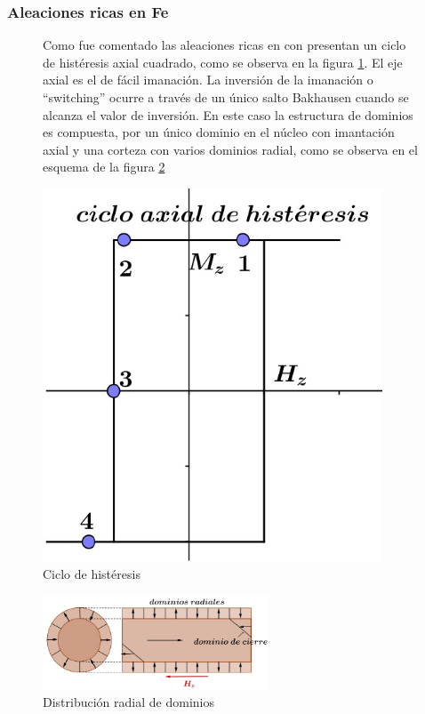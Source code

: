 \subsubsection{Aleaciones ricas en Fe}

\begin{figure}[H]
  \begin{minipage}[b]{0.47\textwidth}
Como fue comentado las aleaciones ricas en con presentan un ciclo de histéresis axial cuadrado, como se observa en la figura \ref{fig:310}. El eje axial es el de fácil imanación. La inversión de la imanación o “switching” ocurre a través de un único salto Bakhausen cuando se alcanza el valor de inversión. En este caso la estructura de dominios es compuesta, por un único dominio en el núcleo con imantación axial y una corteza con varios dominios radial, como se observa en el esquema de la figura \ref{fig:311}
  \vspace{1cm}
  \end{minipage}
  \hfill
  \begin{minipage}[b]{0.47\textwidth}
     \includegraphics[width=0.9\textwidth]{./Figures/fig310}
     \caption{Ciclo de histéresis}
	\label{fig:310}
  \end{minipage}
\end{figure}

\begin{figure}[H]
    \centering
    \includegraphics[width=0.6\textwidth]{./Figures/fig311}
	\caption{Distribución radial de dominios}
	\label{fig:311}    
\end{figure}




